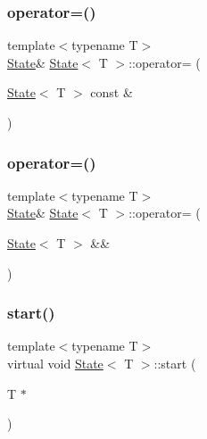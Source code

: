 \mbox{\label{class_state_a9bfd3ed38091f3ac91f58cd379b0b67d}} 
\subsubsection{\texorpdfstring{operator=()}{operator=()}\hspace{0.1cm}{\footnotesize\ttfamily [1/2]}}
{\footnotesize\ttfamily template$<$typename T$>$ \\
\hyperlink{class_state}{State}\& \hyperlink{class_state}{State}$<$ T $>$\+::operator= (\begin{DoxyParamCaption}\item[{\hyperlink{class_state}{State}$<$ T $>$ const \&}]{ }\end{DoxyParamCaption})\hspace{0.3cm}{\ttfamily [delete]}}

\mbox{\label{class_state_a7fcc843d742907e0b8e29e619fd95b27}} 
\subsubsection{\texorpdfstring{operator=()}{operator=()}\hspace{0.1cm}{\footnotesize\ttfamily [2/2]}}
{\footnotesize\ttfamily template$<$typename T$>$ \\
\hyperlink{class_state}{State}\& \hyperlink{class_state}{State}$<$ T $>$\+::operator= (\begin{DoxyParamCaption}\item[{\hyperlink{class_state}{State}$<$ T $>$ \&\&}]{ }\end{DoxyParamCaption})\hspace{0.3cm}{\ttfamily [delete]}}

\mbox{\label{class_state_abc29d36b0462a306ac9b32f36571d783}} 
\subsubsection{\texorpdfstring{start()}{start()}}
{\footnotesize\ttfamily template$<$typename T$>$ \\
virtual void \hyperlink{class_state}{State}$<$ T $>$\+::start (\begin{DoxyParamCaption}\item[{T $\ast$}]{ }\end{DoxyParamCaption})\hspace{0.3cm}{\ttfamily [pure virtual]}}



